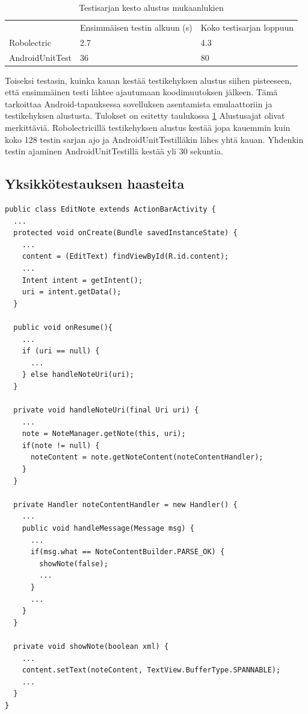 \begin{table}[h]
\centering
\begin{tabular}{ l l l }
   & Ensimmäisen testin alkuun (s) & Koko testisarjan loppuun \\
  Robolectric & 2.7 & 4.3 \\
  AndroidUnitTest & 36 & 80 \\
\end{tabular}
\caption{Testisarjan kesto alustus mukaanlukien}
\label{unittest_startup}
\end{table}

Toiseksi testasin, kuinka kauan kestää testikehyksen alustus siihen pisteeseen, että ensimmäinen testi lähtee ajautumaan koodimuutoksen jälkeen. Tämä tarkoittaa Android-tapauksessa sovelluksen asentamista emulaattoriin ja testikehyksen alustusta. Tulokset on esitetty taulukossa \ref{unittest_startup} Alustusajat olivat merkittäviä. Robolectricillä testikehyksen alustus kestää jopa kauemmin kuin koko 128 testin sarjan ajo ja AndroidUnitTestilläkin lähes yhtä kauan. Yhdenkin testin ajaminen AndroidUnitTestillä kestää yli 30 sekuntia.

\subsection{Yksikkötestauksen haasteita}

\begin{lstlisting}[float, label=tomdroid_example,caption=Tomdroid-koodiesimerkki]
public class EditNote extends ActionBarActivity {
  ...
  protected void onCreate(Bundle savedInstanceState) {
    ...
    content = (EditText) findViewById(R.id.content);
    ...
    Intent intent = getIntent();
    uri = intent.getData();
  }  
  
  public void onResume(){
    ...
    if (uri == null) {
  	  ...
    } else handleNoteUri(uri);
  }

  private void handleNoteUri(final Uri uri) {
    ...
    note = NoteManager.getNote(this, uri);
    if(note != null) {
      noteContent = note.getNoteContent(noteContentHandler);
    }
  }
  
  private Handler noteContentHandler = new Handler() {
    ...
    public void handleMessage(Message msg) {
      ...
      if(msg.what == NoteContentBuilder.PARSE_OK) {
      	showNote(false);
      	...
      }
      ...
    }
  }
  
  private void showNote(boolean xml) {
    ...
    content.setText(noteContent, TextView.BufferType.SPANNABLE);
    ...
  }
}
\end{lstlisting}


